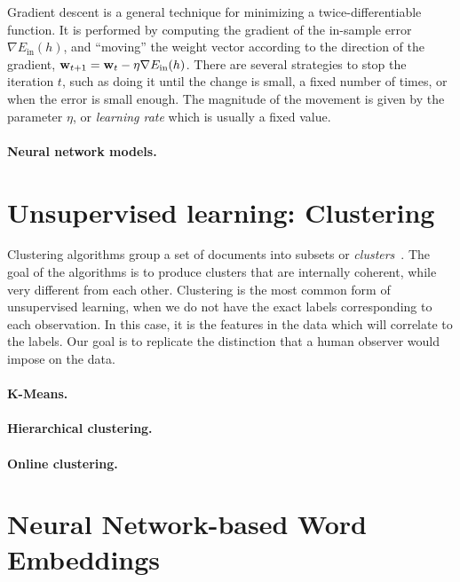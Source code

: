 
Gradient descent is a general technique for minimizing a twice-differentiable
function. 
%
It is performed by computing the gradient of the in-sample error $\nabla
E_{\text{in}}(h)$, and ``moving'' the weight vector according to the direction
of the gradient, $\boldsymbol{\mathbf{w}}_{t+1} = \boldsymbol{\mathbf{w}}_t - \eta\nabla E_{\text{in}}(h)$.
%
There are several strategies to stop the iteration $t$, such as doing it until
the change is small, a fixed number of times, or when the error is small enough.
%
The magnitude of the movement is given by the parameter $\eta$, or {\em learning
rate} which is usually a fixed value.


\paragraph{Neural network models.} 


\section{Unsupervised learning: Clustering}

Clustering algorithms group a set of documents into subsets or {\em
clusters}~\cite{manning2010introduction}.
%
The goal of the algorithms is to produce clusters that are internally coherent,
while very different from each other.
%
Clustering is the most common form of unsupervised learning, when we do not have
the exact labels corresponding to each observation. 
%
In this case, it is the features in the data which will correlate to the labels.
%
Our goal is to replicate the distinction that a human observer would impose on
the data.


\paragraph{K-Means.} 
%

%


\paragraph{Hierarchical clustering.}

\paragraph{Online clustering.}

\section{Neural Network-based Word Embeddings}